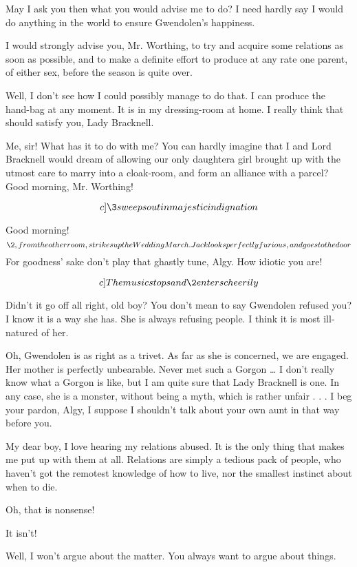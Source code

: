 \documentclass{book}
\begin{document}
\1  May I ask you then what you would advise me to do?  I need
hardly say I would do anything in the world to ensure Gwendolen's
happiness.

\3  I would strongly advise you, Mr. Worthing, to try
and acquire some relations as soon as possible, and to make a
definite effort to produce at any rate one parent, of either sex,
before the season is quite over.

\1  Well, I don't see how I could possibly manage to do that.  I
can produce the hand-bag at any moment.  It is in my dressing-room
at home.  I really think that should satisfy you, Lady Bracknell.

\3  Me, sir!  What has it to do with me?  You can
hardly imagine that I and Lord Bracknell would dream of allowing
our only daughter\textemdash a girl brought up with the utmost care%
\textemdash to
marry into a cloak-room, and form an alliance with a parcel?  Good
morning, Mr. Worthing!

\[c]\3 sweeps out in majestic indignation\]

\1  Good morning!  \[\2, from the other room, strikes up
the Wedding March.  Jack looks perfectly furious, and goes to the
door\]  For goodness' sake don't play that ghastly tune, Algy.  How
idiotic you are!

\[c]The music stops and \2 enters cheerily\]

\2  Didn't it go off all right, old boy?  You don't mean to
say Gwendolen refused you?  I know it is a way she has.  She is
always refusing people.  I think it is most ill-natured of her.

\1  Oh, Gwendolen is as right as a trivet.  As far as she is
concerned, we are engaged.  Her mother is perfectly unbearable.
Never met such a Gorgon \ldots{} I don't really know what a Gorgon is
like, but I am quite sure that Lady Bracknell is one.  In any case,
she is a monster, without being a myth, which is rather unfair . .
. I beg your pardon, Algy, I suppose I shouldn't talk about your
own aunt in that way before you.

\2  My dear boy, I love hearing my relations abused.  It is
the only thing that makes me put up with them at all.  Relations
are simply a tedious pack of people, who haven't got the remotest
knowledge of how to live, nor the smallest instinct about when to
die.

\1  Oh, that is nonsense!

\2  It isn't!

\1  Well, I won't argue about the matter.  You always want to
argue about things.
\end{document}
